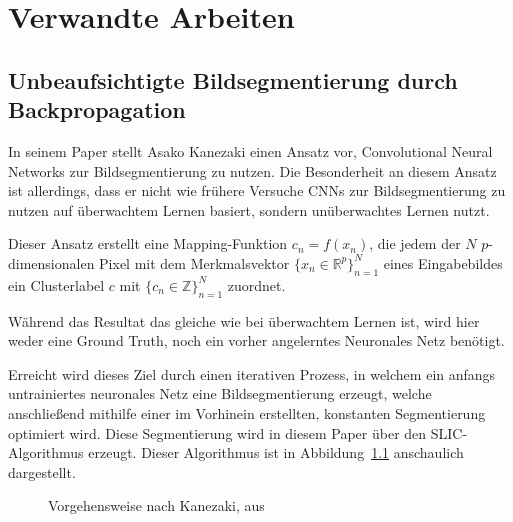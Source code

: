 \chapter{Verwandte Arbeiten}
\label{chap:verwarbeiten}

\section{Unbeaufsichtigte Bildsegmentierung durch Backpropagation}
\label{sec:kanezaki}
In seinem Paper \cite{kanezaki} stellt Asako Kanezaki einen Ansatz vor, Convolutional Neural Networks zur Bildsegmentierung zu nutzen. Die Besonderheit an diesem Ansatz ist allerdings, dass er nicht wie frühere Versuche CNNs zur Bildsegmentierung zu nutzen auf überwachtem Lernen basiert, sondern unüberwachtes Lernen nutzt.

Dieser Ansatz erstellt eine Mapping-Funktion $c_n=f(x_n)$, die jedem der $N$ $p$-dimensionalen Pixel mit dem Merkmalsvektor $\{x_n\in\mathbb{R}^p\}_{n=1}^N$ eines Eingabebildes ein Clusterlabel $c$ mit $\{c_n\in\mathbb{Z}\}_{n=1}^N$ zuordnet.

Während das Resultat das gleiche wie bei überwachtem Lernen ist, wird hier weder eine Ground Truth, noch ein vorher angelerntes Neuronales Netz benötigt.

Erreicht wird dieses Ziel durch einen iterativen Prozess, in welchem ein anfangs untrainiertes neuronales Netz eine Bildsegmentierung erzeugt, welche anschließend mithilfe einer im Vorhinein erstellten, konstanten Segmentierung optimiert wird. Diese Segmentierung wird in diesem Paper über den SLIC-Algorithmus\cite{slic} erzeugt. Dieser Algorithmus ist in Abbildung~\ref{fig:kanezaki_flowchart} anschaulich dargestellt.

\begin{figure}
	\caption{Vorgehensweise nach Kanezaki, aus \cite{kanezaki}}
	\label{fig:kanezaki_flowchart}
\end{figure}

